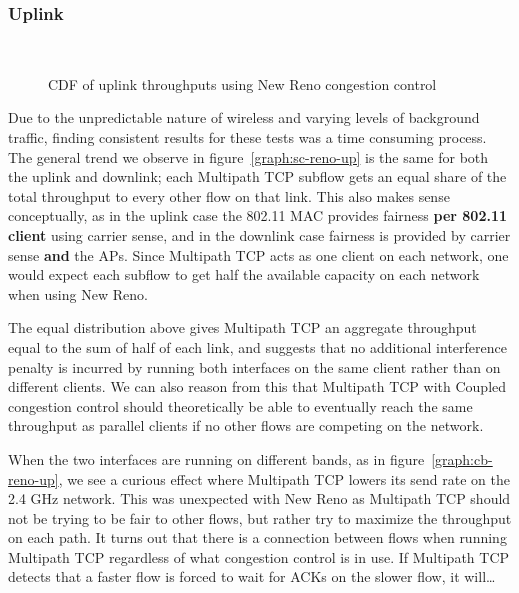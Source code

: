 \subsubsection{Uplink}
\label{sec:results-mptcp-up}

\begin{figure}[h]
 \centering
 \subfloat[][2.4 GHz, disparate channel] {\
   \scalebox{0.55}{}\label{graph:cc-reno-up}
 }
 \\
 \subfloat[][5 and 2.4 GHz] {\
   \scalebox{0.55}{}\label{graph:cb-reno-up}
 }

 \caption{CDF of uplink throughputs using New Reno congestion control}\label{graph:reno-up}
\end{figure}

Due to the unpredictable nature of wireless and varying levels of background traffic, finding consistent results for these tests was a time consuming process. The general trend we observe in figure~\ref{graph:sc-reno-up} is the same for both the uplink and downlink; each Multipath TCP subflow gets an
equal share of the total throughput to every other flow on that link. This also makes
sense conceptually, as in the uplink case the 802.11 MAC provides fairness \textbf{per 802.11
client} using carrier sense, and in the downlink case
fairness is provided by carrier sense \textbf{and} the APs. Since
Multipath TCP acts as one client on each network, one would expect each subflow to
get half the available capacity on each network when using New Reno.

The equal distribution above gives Multipath TCP an aggregate throughput equal to
the sum of half of each link, and suggests that no additional interference
penalty is incurred by running both interfaces on the same client rather than on
different clients. We can also reason from this that Multipath TCP with Coupled
congestion control should theoretically be able to eventually reach the same
throughput as parallel clients if no other flows are competing on the network.

When the two interfaces are running on different bands, as in
figure~\ref{graph:cb-reno-up}, we see a curious effect where Multipath TCP lowers its send rate on the 2.4 GHz network. This was unexpected with New Reno as Multipath
TCP should not be trying to be fair to other flows, but rather try to maximize
the throughput on each path. It turns out that there is a connection between
flows when running Multipath TCP regardless of what congestion control is in
use. If Multipath TCP detects that a faster flow is forced to wait for ACKs on %
the slower flow, it will… %

